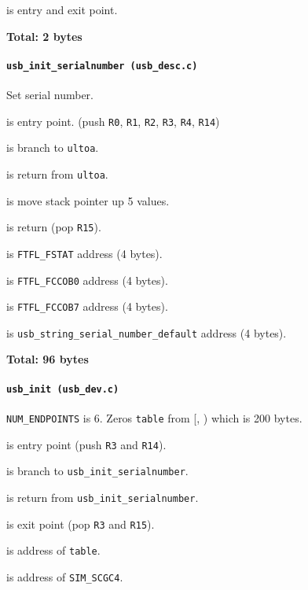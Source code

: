  is entry and exit point.

\textbf{Total: 2 bytes}

\paragraph{\texttt{usb\_init\_serialnumber (usb\_desc.c)}} Set serial number.

 is entry point.
(push \texttt{R0}, \texttt{R1}, \texttt{R2}, \texttt{R3},
\texttt{R4}, \texttt{R14})

 is branch to \texttt{ultoa}.

 is return from \texttt{ultoa}.

 is move stack pointer up 5 values.

 is return (pop \texttt{R15}).

\vspace{1em}

 is \texttt{FTFL\_FSTAT} address (4 bytes).

 is \texttt{FTFL\_FCCOB0} address (4 bytes).

 is \texttt{FTFL\_FCCOB7} address (4 bytes).

 is {\tiny
\texttt{usb\_string\_serial\_number\_default}} address (4 bytes).

\textbf{Total: 96 bytes}

\paragraph{\texttt{usb\_init (usb\_dev.c)}} \texttt{NUM\_ENDPOINTS} is 6.
Zeros \texttt{table} from [,
) which is 200 bytes.

 is entry point (push \texttt{R3} and \texttt{R14}).

 is branch to \texttt{usb\_init\_serialnumber}.

 is return from \texttt{usb\_init\_serialnumber}.

 is exit point (pop \texttt{R3} and \texttt{R15}).

 is address of \texttt{table}.

 is address of \texttt{SIM\_SCGC4}.


